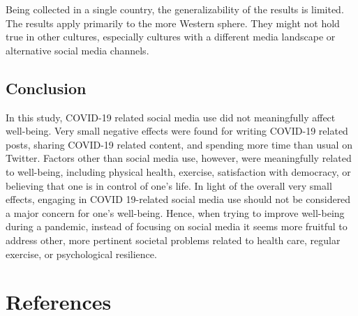 \documentclass[
  man,mask,floatsintext]{apa7}
\begin{document}
Being collected in a single country, the generalizability of the results is limited.
The results apply primarily to the more Western sphere.
They might not hold true in other cultures, especially cultures with a different media landscape or alternative social media channels.

\hypertarget{conclusion}{%
\subsection{Conclusion}\label{conclusion}}

In this study, COVID-19 related social media use did not meaningfully affect well-being.
Very small negative effects were found for writing COVID-19 related posts, sharing COVID-19 related content, and spending more time than usual on Twitter.
Factors other than social media use, however, were meaningfully related to well-being, including physical health, exercise, satisfaction with democracy, or believing that one is in control of one's life.
In light of the overall very small effects, engaging in COVID 19-related social media use should not be considered a major concern for one's well-being.
Hence, when trying to improve well-being during a pandemic, instead of focusing on social media it seems more fruitful to address other, more pertinent societal problems related to health care, regular exercise, or psychological resilience.

\newpage

\hypertarget{references}{%
\section{References}\label{references}}
\end{document}
